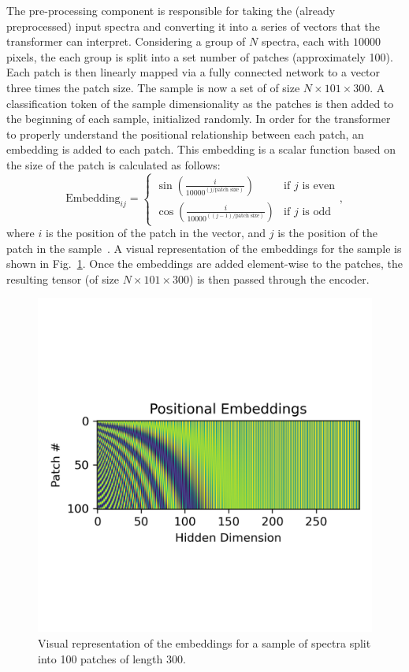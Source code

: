 The pre-processing component is responsible for taking the (already preprocessed)
input spectra and converting it into a series of vectors that the transformer can interpret. 
Considering a group of $N$ spectra, each with $10000$ pixels, the each group 
is split into a set number of patches (approximately 100). Each patch is then 
linearly mapped via a fully connected network to a vector three times the patch size.
The sample is now a set of of size $N\times101\times300$. 
A classification token of the sample dimensionality as the patches 
is then added to the beginning of each sample, initialized randomly. 
In order for the transformer to properly understand the positional relationship between each patch, an embedding 
is added to each patch. This embedding is a scalar function based on the size 
of the patch is calculated as follows: 
\begin{equation}
    \text{Embedding}_{ij} = \begin{cases} \sin\left(\frac{i}{10000^{(j / \text{patch size})}}\right) & \text{if } j \text{ is even} \\
    \cos\left(\frac{i}{10000^{((j - 1) / \text{patch size})}}\right) & \text{if } j \text{ is odd}\end{cases},
\end{equation}
where $i$ is the position of the patch in the vector, and $j$ is the position of the patch in the sample~\cite{vaswani2017}.
A visual representation of the embeddings for the sample is shown in Fig.~\ref{fig:embedding}. Once the 
embeddings are added element-wise to the patches, the resulting tensor (of size $N\times101\times300$) is then passed through the encoder. 
\begin{figure}[H]
    \centering
    \includegraphics[width=.4\linewidth]{figures/embeddings.png}
    \caption{Visual representation of the embeddings for a sample of spectra split into 100 patches of length 300.}
    \label{fig:embedding}
\end{figure}

